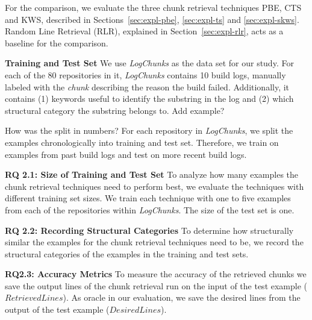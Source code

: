 For the comparison, we evaluate the three chunk retrieval techniques
PBE, CTS and KWS, described in Sections~\ref{sec:expl-pbe},
\ref{sec:expl-ts} and \ref{sec:expl-skws}.
Random Line Retrieval
(RLR), explained in Section~\ref{sec:expl-rlr}, acts as a baseline for
the comparison.

\noindent
\textbf{Training and Test Set}
We use \emph{LogChunks} as the data set for our study.
For each of the
80 repositories in it, \emph{LogChunks} contains 10 build logs,
manually labeled with the \emph{chunk} describing the
reason the build failed.
Additionally, it contains (1) keywords useful
to identify the substring in the log  and (2) which structural category
the substring belongs to.
Add example?

How was the split in numbers?
For each repository in \emph{LogChunks}, we split the examples
chronologically into training and test set.
Therefore, we train on
examples from past build logs and test on more recent build logs.

\noindent %
\textbf{RQ 2.1: Size of Training and Test Set}
To analyze how many examples the chunk retrieval techniques need to
perform best, we evaluate the techniques with different training set
sizes.
We train each technique with one to five examples from each of
the repositories within \emph{LogChunks}.
The size of the test set is
one.

\noindent
\textbf{RQ 2.2: Recording Structural Categories}
To determine how structurally similar the examples for the chunk
retrieval techniques need to be, we record the structural categories
of the examples in the training and test sets.

\noindent
\textbf{RQ2.3: Accuracy Metrics}
To measure the accuracy of the retrieved chunks we save the output
lines of the chunk retrieval run on the input of the test example
($\mathit{RetrievedLines}$).
As oracle in our evaluation, we save the
desired lines from the output of the test example
($\mathit{DesiredLines}$).

